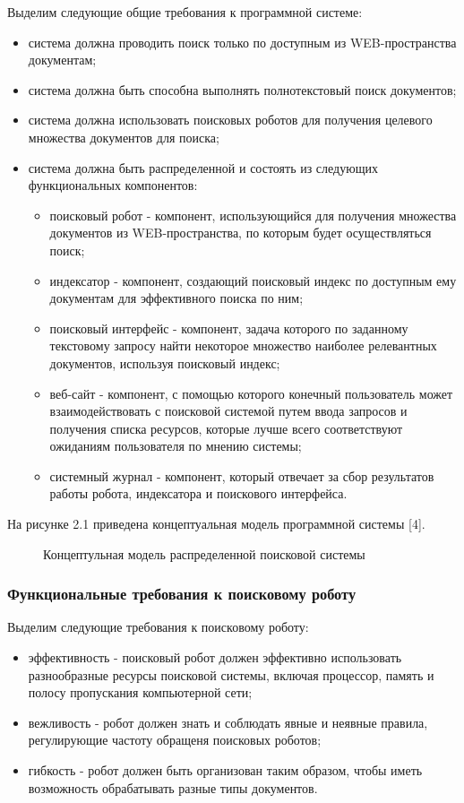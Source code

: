 Выделим следующие общие требования к программной системе:
\begin{itemize}
\item система должна проводить поиск только по доступным из WEB-пространства документам;
\item система должна быть способна выполнять полнотекстовый поиск документов;
\item система должна использовать поисковых роботов для получения целевого множества документов для поиска;
\item система должна быть распределенной и состоять из следующих функциональных компонентов:
\begin{itemize}
\item поисковый робот - компонент, использующийся для получения множества документов из WEB-пространства, по которым будет осуществляться поиск;
\item индексатор - компонент, создающий поисковый индекс по доступным ему документам для эффективного поиска по ним;
\item поисковый интерфейс - компонент, задача которого по заданному текстовому запросу найти некоторое множество наиболее релевантных документов, используя поисковый индекс;
\item веб-сайт - компонент, с помощью которого конечный пользователь может взаимодействовать с поисковой системой путем ввода запросов и получения списка ресурсов, которые лучше всего соответствуют ожиданиям пользователя по мнению системы;
\item системный журнал - компонент, который отвечает за сбор результатов работы робота, индексатора и поискового интерфейса.
\end{itemize}
\end{itemize}

На рисунке 2.1 приведена концептуальная модель программной системы [4].

\begin{figure}[H]
\caption{Концептульная модель распределенной поисковой системы}
\label{concept_system_model:image}
\end{figure}

\subsubsection{Функциональные требования к поисковому роботу}
Выделим следующие требования к поисковому роботу:
\begin{itemize}
\item эффективность - поисковый робот должен эффективно использовать разнообразные ресурсы поисковой системы, включая процессор, память и полосу пропускания компьютерной сети;
\item вежливость - робот должен знать и соблюдать явные и неявные правила, регулирующие частоту обращеня поисковых роботов;
\item гибкость - робот должен быть организован таким образом, чтобы иметь возможность обрабатывать разные типы документов.
\end{itemize}

